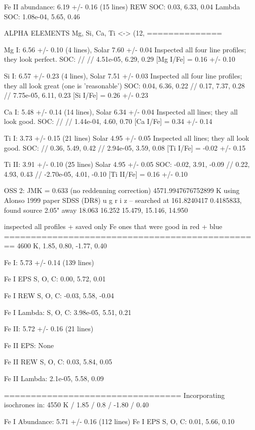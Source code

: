 \documentclass{emulateapj}
\begin{document}
Fe II abundance: 6.19 +/- 0.16 (15 lines)
REW SOC: 0.03, 6.33, 0.04
Lambda SOC: 1.08e-04, 5.65, 0.46


ALPHA ELEMENTS Mg, Si, Ca, Ti <-> (12, 
==============


Mg I: 6.56 +/- 0.10 (4 lines), Solar 7.60 +/- 0.04
Inspected all four line profiles; they look perfect.
SOC: // // 4.51e-05, 6.29, 0.29
[Mg I/Fe] = 0.16 +/- 0.10

Si I: 6.57 +/- 0.23 (4 lines), Solar 7.51 +/- 0.03
Inspected all four line profiles; they all look great (one is 'reasonable')
SOC: 0.04, 6.36, 0.22 // 0.17, 7.37, 0.28 // 7.75e-05, 6.11, 0.23
[Si I/Fe] = 0.26 +/- 0.23

Ca I: 5.48 +/- 0.14 (14 lines), Solar 6.34 +/- 0.04
Inspected all lines; they all look good.
SOC: // // 1.44e-04, 4.60, 0.70
[Ca I/Fe] = 0.34 +/- 0.14

Ti I: 3.73 +/- 0.15 (21 lines) Solar 4.95 +/- 0.05
Inspected all lines; they all look good.
SOC: // 0.36, 5.49, 0.42 // 2.94e-05, 3.59, 0.08
[Ti I/Fe] = -0.02 +/- 0.15

Ti II: 3.91 +/- 0.10 (25 lines) Solar 4.95 +/- 0.05
SOC: -0.02, 3.91, -0.09 // 0.22, 4.93, 0.43 // -2.70e-05, 4.01, -0.10
[Ti II/Fe] = 0.16 +/- 0.10



OSS 2: JMK = 0.633 (no reddenning correction)
4571.9947676752899 K using Alonso 1999 paper
SDSS (DR8) u g r i z -- searched at 161.8240417 0.4185833, found source 2.05" away
18.063 16.252 15.479, 15.146, 14.950

inspected all profiles + saved only Fe ones that were good in red + blue
================================================
4600 K, 1.85, 0.80, -1.77, 0.40

Fe I: 5.73 +/- 0.14 (139 lines)

Fe I EPS
S, O, C: 0.00, 5.72, 0.01

Fe I REW
S, O, C: -0.03, 5.58, -0.04

Fe I Lambda:
S, O, C: 3.98e-05, 5.51, 0.21

Fe II: 5.72 +/- 0.16 (21 lines)

Fe II EPS: None

Fe II REW S, O, C: 0.03, 5.84, 0.05

Fe II Lambda: 2.1e-05, 5.58, 0.09

=================================
Incorporating isochrones in:
4550 K / 1.85 / 0.8 / -1.80 / 0.40

Fe I Abundance: 5.71 +/- 0.16 (112 lines)
Fe I EPS S, O, C: 0.01, 5.66, 0.10
\end{document}

